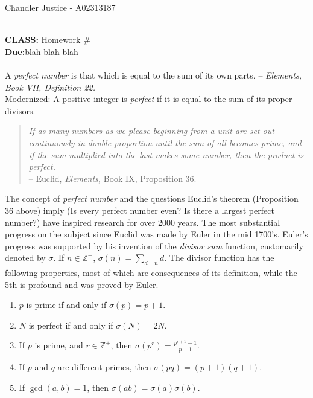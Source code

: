\documentclass[10pt]{article}
\newcommand{\Z}{\mathbb{Z}}
\begin{document}
\begin{flushright}
Chandler Justice - A02313187
\end{flushright}
\noindent \underline{\hspace{3in}}\\
\textbf{CLASS:} Homework \#\\
\textbf{Due:}blah blah blah\\


	\\
	
	\noindent A \emph{perfect number} is that which is equal to the sum of its own parts.  -- \emph{Elements, Book VII, Definition 22.} \\
	
	\noindent \textsf{Modernized:} A positive integer is \emph{perfect} if it is equal to the sum of its proper divisors.
	
	\begin{quotation}
		\noindent \emph{If as many numbers as we please beginning from a unit are set out continuously in double proportion until the sum of all becomes prime, and if the sum multiplied into the last makes some number, then the product is perfect.} \\ 
		\hspace{3in.} -- Euclid, \emph{Elements,} Book IX, Proposition 36.
	\end{quotation}
	
	The concept of \emph{perfect number} and the questions Euclid's theorem (Proposition 36 above) imply (Is every perfect number even?  Is there a largest perfect number?) have inspired research for over 2000 years.  
	The most substantial progress on the subject since Euclid was made by Euler in the mid 1700's.
	Euler's progress was supported by his invention of the  \emph{divisor sum} function, customarily denoted by $\sigma$.  
	If $n \in \Z^+$, $\sigma(n) = \sum_{ d \,\mid \, n} d$.  
	The divisor function has the following properties, most of which are consequences of its definition, while the 5th is profound and was proved by Euler. 
	\begin{enumerate}
		\item[$\sigma$-1.] $p$ is prime if and only if $\sigma(p) = p+1$.
		\item[$\sigma$-2.] $N$ is perfect if and only if $\sigma(N) = 2N$.
		\item[$\sigma$-3.] If $p$ is prime, and $r \in \Z^+$, then $\sigma(p^r) = \frac{p^{r+1}-1}{p-1}$.
		\item[$\sigma$-4.] If $p$ and $q$ are different primes, then $\sigma(pq) = (p+1)(q+1)$.
		\item[$\sigma$-5.] If $\gcd(a,b)=1$, then $\sigma(ab) = \sigma(a)\sigma(b)$.
	\end{enumerate}
	
\end{document}
